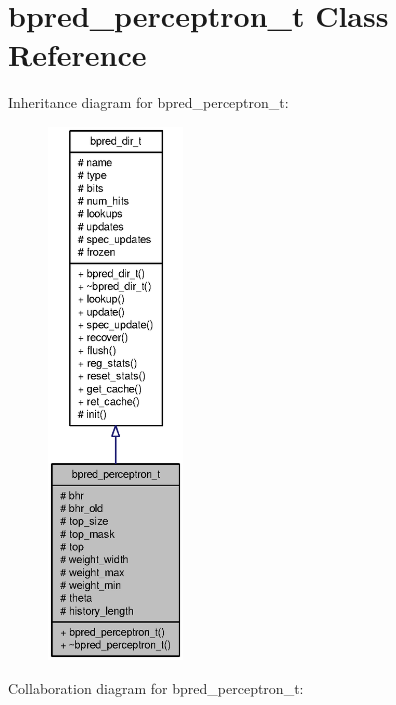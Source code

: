\section{bpred\_\-perceptron\_\-t Class Reference}
\label{classbpred__perceptron__t}
Inheritance diagram for bpred\_\-perceptron\_\-t:\nopagebreak
\begin{figure}[H]
\begin{center}
\leavevmode
\includegraphics[height=400pt]{classbpred__perceptron__t__inherit__graph}
\end{center}
\end{figure}
Collaboration diagram for bpred\_\-perceptron\_\-t:\nopagebreak
